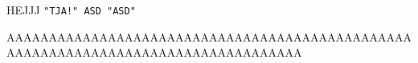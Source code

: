 
HEJJJ \texttt{"TJA!"
ASD
"ASD"
}


AAAAAAAAAAAAAAAAAAAAAAAAAAAAAAAAAAAAAAAAAAAAAAAAAAAAAAAAAAAAAAAAAAAAAAAAAAAAAAAAAAA